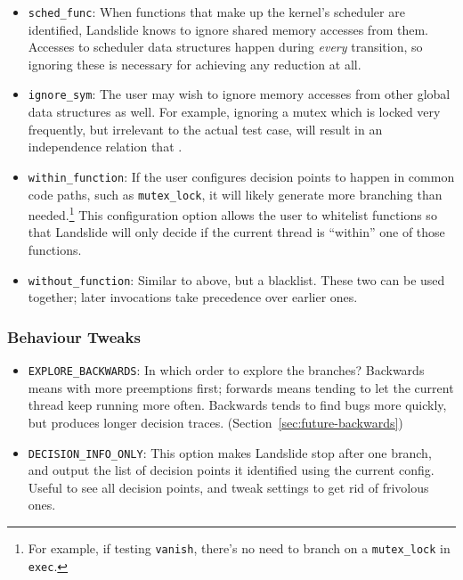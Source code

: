 \begin{itemize}
	\small
	\item \texttt{sched\_func}: When functions that make up the kernel's scheduler are identified, Landslide knows to ignore shared memory accesses from them. Accesses to scheduler data structures happen during {\em every} transition, so ignoring these is necessary for achieving any reduction at all.
	\item \texttt{ignore\_sym}: The user may wish to ignore memory accesses from other global data structures as well. For example, ignoring a mutex which is locked very frequently, but irrelevant to the actual test case, will result in an independence relation that .
	\item \texttt{within\_function}: If the user configures decision points to happen in common code paths, such as \texttt{mutex\_lock}, it will likely generate more branching than needed.\footnote{
For example, if testing \texttt{vanish}, there's no need to branch on a \texttt{mutex\_lock} in \texttt{exec}.}
This configuration option allows the user to whitelist functions so that Landslide will only decide if the current thread is ``within'' one of those functions.
	\item \texttt{without\_function}: Similar to above, but a blacklist. These two can be used together; later invocations take precedence over earlier ones.
\end{itemize}

\subsubsection{Behaviour Tweaks}
\begin{itemize}
	\small
	\item \texttt{EXPLORE\_BACKWARDS}: In which order to explore the branches? Backwards means with more preemptions first; forwards means tending to let the current thread keep running more often. Backwards tends to find bugs more quickly, but produces longer decision traces. (Section~\ref{sec:future-backwards})
	\item \texttt{DECISION\_INFO\_ONLY}: This option makes Landslide stop after one branch, and output the list of decision points it identified using the current config. Useful to see all decision points, and tweak settings to get rid of frivolous ones.
\end{itemize}

